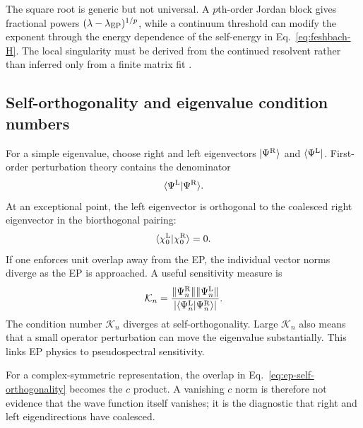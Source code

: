 The square root is generic but not universal.  A $p$th-order Jordan block gives
fractional powers $(\lambda-\lambda_{\mathrm{EP}})^{1/p}$, while a continuum
threshold can modify the exponent through the energy dependence of the
self-energy in Eq.~\eqref{eq:feshbach-H}.  The local singularity must be
derived from the continued resolvent rather than inferred only from a finite
matrix fit
\cite{Ashida2020NonHermitian,Garmon2021AnomalousEP}.

\subsection{Self-orthogonality and eigenvalue condition numbers}
\label{subsec:self-orthogonality}

For a simple eigenvalue, choose right and left eigenvectors
$\lvert \Psi^{\mathrm R} \rangle$ and $\langle \Psi^{\mathrm L} \rvert$.  First-order
perturbation theory contains the denominator
\begin{equation}
  \langle \Psi^{\mathrm L}|\Psi^{\mathrm R} \rangle .
  \label{eq:left-right-overlap}
\end{equation}
At an exceptional point, the left eigenvector is orthogonal to the coalesced
right eigenvector in the biorthogonal pairing:
\begin{equation}
  \langle \chi_0^{\mathrm L}|\chi_0^{\mathrm R} \rangle=0 .
  \label{eq:ep-self-orthogonality}
\end{equation}
If one enforces unit overlap away from the EP, the individual vector norms
diverge as the EP is approached.  A useful sensitivity measure is
\begin{equation}
  \mathcal K_n
  =\frac{\lVert\Psi_n^{\mathrm R}\rVert
  \lVert\Psi_n^{\mathrm L}\rVert}
  {\left|\langle \Psi_n^{\mathrm L}|\Psi_n^{\mathrm R} \rangle\right|} .
  \label{eq:eigenvalue-condition-number}
\end{equation}
The condition number $\mathcal K_n$ diverges at self-orthogonality.  Large
$\mathcal K_n$ also means that a small operator perturbation can move the
eigenvalue substantially.  This links EP physics to pseudospectral
sensitivity.

For a complex-symmetric representation, the overlap in
Eq.~\eqref{eq:ep-self-orthogonality} becomes the $c$ product.  A vanishing
$c$ norm is therefore not evidence that the wave function itself vanishes; it
is the diagnostic that right and left eigendirections have coalesced.

